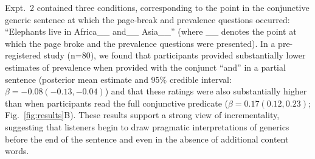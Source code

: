 \documentclass[letterpaper, 12pt]{article}
\newcommand{\denote}[1]{\mbox{ $[\![ #1 ]\!]$}}
\begin{document}
Expt.~2 contained three conditions, corresponding to the point in the conjunctive generic sentence at which the page-break and prevalence questions occurred: ``Elephants live in Africa\_\_ and\_\_ Asia\_\_'' (where \_\_ denotes the point at which the page broke and the prevalence questions were presented).
In a pre-registered study (n=80), we found that participants provided substantially lower estimates of prevalence when provided with the conjunct ``and'' in a partial sentence (posterior mean estimate and 95\% credible interval: $\beta = -0.08 (-0.13, -0.04)$) and that these ratings were also substantially higher than when participants read the full conjunctive predicate ($\beta = 0.17 (0.12, 0.23)$; Fig.~\ref{fig:results}B). 
These results support a strong view of incrementality, suggesting that listeners begin to draw pragmatic interpretations of generics before the end of the sentence and even in the absence of additional content words. 





\vspace{-0.1cm}

\begingroup
\renewcommand{\section}[2]{}


\setlength{\bibleftmargin}{.125in}
\setlength{\bibindent}{-\bibleftmargin}


\renewcommand\bibname{}
\scriptsize
%
\endgroup
\end{document}
